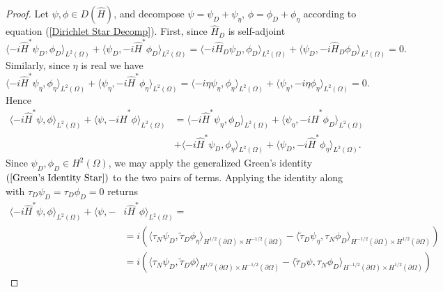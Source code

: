 \documentclass{article}
\numberwithin{equation}{section}
\begin{document}
      \begin{proof}
          Let $\psi,\phi \in D(\hat{H})$, and decompose $\psi= \psi_D + \psi_\eta$, $\phi=\phi_D + \phi_\eta$ according to equation (\ref{Dirichlet Star Decomp}). First, since $\hat{H}_D$ is self-adjoint 
          \begin{equation}
           \langle -i\hat{H}^* \psi_D,\phi_D \rangle_{L^2(\Omega)} + \langle \psi_D,-i\hat{H}^* \phi_D \rangle_{L^2(\Omega)}=\langle -i\hat{H}_D \psi_D,\phi_D \rangle_{L^2(\Omega)} + \langle \psi_D,-i\hat{H}_D \phi_D \rangle_{L^2(\Omega)}=0.
          \end{equation}
          Similarly, since $\eta$ is real we have 
          \begin{equation}
           \langle -i\hat{H}^* \psi_\eta,\phi_\eta \rangle_{L^2(\Omega)} + \langle \psi_\eta,-i\hat{H}^* \phi_\eta \rangle_{L^2(\Omega)}=\langle -i\eta\psi_\eta,\phi_\eta \rangle_{L^2(\Omega)} + \langle \psi_\eta,-i\eta \phi_\eta \rangle_{L^2(\Omega)}=0.
           \end{equation}
           Hence
\begin{equation}
    \begin{split}
             \langle -i\hat{H}^* \psi,\phi \rangle_{L^2(\Omega)} + \langle \psi,-i\hat{H}^* \phi \rangle_{L^2(\Omega)}&=\langle -i\hat{H}^* \psi_\eta,\phi_D \rangle_{L^2(\Omega)} +\langle \psi_\eta,-i\hat{H}^* \phi_D \rangle_{L^2(\Omega)}
             \\
             &+ \langle -i\hat{H}^* \psi_D,\phi_\eta \rangle_{L^2(\Omega)} +\langle \psi_D,-i\hat{H}^* \phi_\eta \rangle_{L^2(\Omega)}.
    \end{split}
\end{equation}
Since $\psi_D, \phi_D \in H^2(\Omega)$, we may apply the generalized Green's identity $(\ref{Green's Identity Star})$ to the two pairs of terms. Applying the identity along with $\tau_D \psi_D= \tau_D \phi_D=0$ returns
\begin{equation}\label{Gen Green's Identity Inner Prod}
\begin{split}
    \langle -i\hat{H}^* \psi,\phi \rangle_{L^2(\Omega)} + \langle \psi,-&i\hat{H}^* \phi \rangle_{L^2(\Omega)}=
    \\
    &=i\left( \langle \tau_N \psi_D, \tilde{\tau}_D \phi_\eta \rangle_{H^{1/2}(\partial \Omega)\times H^{-1/2}(\partial \Omega)} -\langle  \tilde{\tau}_D \psi_\eta, \tau_N \phi_D \rangle_{H^{-1/2}(\partial \Omega)\times H^{1/2}(\partial \Omega)}\right)
    \\
    &=i\left( \langle \tau_N \psi_D, \tilde{\tau}_D \phi \rangle_{H^{1/2}(\partial \Omega)\times H^{-1/2}(\partial \Omega)} -\langle  \tilde{\tau}_D \psi, \tau_N \phi_D \rangle_{H^{-1/2}(\partial \Omega)\times H^{1/2}(\partial \Omega)}\right)

\end{split}
\end{equation}
\end{proof}
\end{document}
